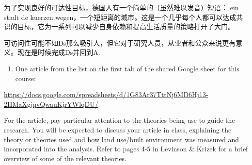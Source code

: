 \documentclass[12pt,]{article}
\providecommand{\tightlist}{%
  \setlength{\itemsep}{0pt}\setlength{\parskip}{0pt}}
\begin{document}
为了实现良好的可达性目标，德国人有一个简单的（虽然难以发音）短语： ein
stadt de kuerzen
wegen，一个短距离的城市。这是一个几乎每个人都可以达成共识的目标，它为一系列可以减少自身依赖和提高生活质量的策略打开了大门。

可访问性可能不如Ds那么吸引人，但它对于研究人员，从业者和公众来说更有意义。现在是时候完成Ds并回到A.

\begin{enumerate}
\def\labelenumi{\arabic{enumi}.}
\setcounter{enumi}{3}
\tightlist
\item
  One article from the list on the first tab of the shared Google sheet
  for this course:
\end{enumerate}

\url{https://docs.google.com/spreadsheets/d/1G83Ar37TttNj6MD6Hj13-2HMaXgjqvQwauKjrYWlqDU/}

For the article, pay particular attention to the theories being use to
guide the research. You will be expected to discuss your article in
class, explaining the theory or theories used and how land use/built
environment was measured and incorporated into the analysis. Refer to
pages 4-5 in Levinson \& Krizek for a brief overview of some of the
relevant theories.
\end{document}
